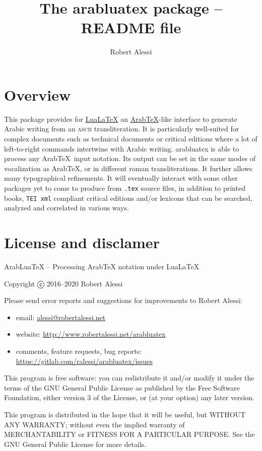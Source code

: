 \documentclass{article}
\title{The arabluatex package -- README file}
\author{Robert Alessi}
\begin{document}
\maketitle

\section*{Overview}
\label{sec:overview}
This package provides for \href{http://luatex.org}{Lua\LaTeX} an
\href{http://ctan.org/pkg/arabtex}{Arab\TeX}-like interface to
generate Arabic writing from an \textsc{ascii} transliteration. It is
particularly well-suited for complex documents such as technical
documents or critical editions where a lot of left-to-right commands
intertwine with Arabic writing. arabluatex is able to process any
Arab\TeX\ input notation. Its output can be set in the same modes of
vocalization as Arab\TeX, or in different roman transliterations. It
further allows many typographical refinements. It will eventually
interact with some other packages yet to come to produce from
\verb|.tex| source files, in addition to printed books, \texttt{TEI
  xml} compliant critical editions and/or lexicons that can be
searched, analyzed and correlated in various ways.

\section*{License and disclamer}
ArabLuaTeX -- Processing ArabTeX notation under LuaLaTeX

Copyright ⓒ 2016--2020  Robert Alessi

Please send error reports and suggestions for improvements to Robert
Alessi:
\begin{itemize}
\item email: \href{mailto:alessi@robertalessi.net}{alessi@robertalessi.net}
\item website: \url{http://www.robertalessi.net/arabluatex}
\item comments, feature requests, bug reports:
  \url{https://gitlab.com/ralessi/arabluatex/issues}
\end{itemize}

This program is free software: you can redistribute it and/or modify
it under the terms of the GNU General Public License as published by
the Free Software Foundation, either version 3 of the License, or
(at your option) any later version.

This program is distributed in the hope that it will be useful, but
WITHOUT ANY WARRANTY; without even the implied warranty of
MERCHANTABILITY or FITNESS FOR A PARTICULAR PURPOSE.  See the GNU
General Public License for more details.
\end{document}
